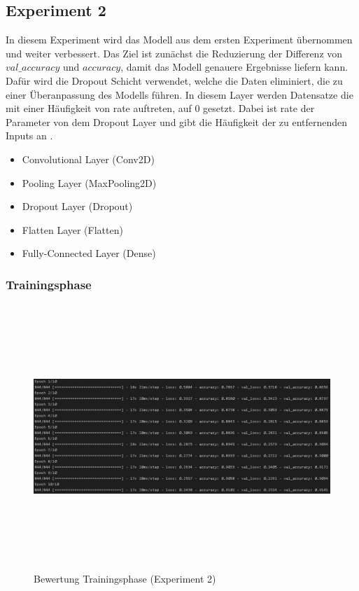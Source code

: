 \documentclass[12pt]{scrreprt}
\begin{document}
\subsection{Experiment 2}\label{model:ep2}
	
In diesem Experiment wird das Modell aus dem ersten Experiment übernommen und weiter verbessert. Das Ziel ist zunächst die Reduzierung der Differenz von $val\_accuracy$ und $accuracy$, damit das Modell genauere Ergebnisse liefern kann. Dafür wird die Dropout Schicht verwendet, welche die Daten eliminiert, die zu einer Überanpassung des Modells führen. In diesem Layer werden Datensatze die mit einer Häufigkeit von rate auftreten, auf 0 gesetzt. Dabei ist rate der Parameter von dem Dropout Layer und gibt die Häufigkeit der zu entfernenden Inputs an \cite{tensorflow2022}.\\

\begin{itemize}
	\item Convolutional Layer (Conv2D)
	\item Pooling Layer (MaxPooling2D)
	\item Dropout Layer (Dropout)
	\item Flatten Layer (Flatten)
	\item Fully-Connected Layer (Dense)
	\label{tab:model2}
\end{itemize}

\subsubsection{Trainingsphase}

\begin{figure}[h!]
	\centering
	\includegraphics[width=14.5cm, height=10cm]		{ExperimentModelTrainingsphase_2.png}
	\caption{ Bewertung Trainingsphase \cite{HK22}(Experiment 2)}
	\label{fig:fig16}
\end{figure}
\end{document}
